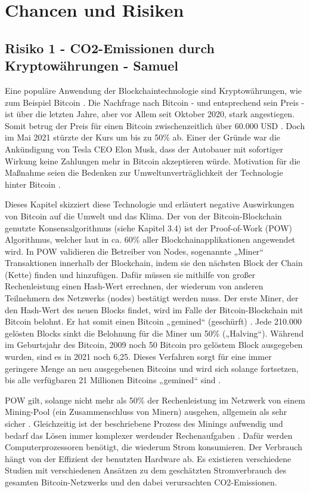 \chapter{Chancen und Risiken}
\section{Risiko 1 - CO2-Emissionen durch Kryptowährungen - Samuel}
Eine populäre Anwendung der Blockchaintechnologie sind Kryptowährungen, wie zum Beispiel Bitcoin \cite{schinckus_good_2020}. Die Nachfrage nach Bitcoin - und entsprechend sein Preis - ist über die letzten Jahre, aber vor Allem seit Oktober 2020, stark angestiegen. Somit betrug der Preis für einen Bitcoin zwischenzeitlich über 60.000 USD \cite{noauthor_coindesk_2021}. Doch im Mai 2021 stürzte der Kurs um bis zu 50\% ab. Einer der Gründe war die Ankündigung von Tesla CEO Elon Musk, dass der Autobauer mit sofortiger Wirkung keine Zahlungen mehr in Bitcoin akzeptieren würde. Motivation für die Maßnahme seien die Bedenken zur Umweltunverträglichkeit der Technologie hinter Bitcoin \cite{waters_musk_2021}. 

Dieses Kapitel skizziert diese Technologie und erläutert negative Auswirkungen von Bitcoin auf die Umwelt und das Klima. \newline
Der von der Bitcoin-Blockchain genutzte Konsensalgorithmus (siehe Kapitel 3.4) ist der Proof-of-Work (POW) Algorithmus, welcher laut \cite{andoni_blockchain_2019} in ca. 60\% aller Blockchainapplikationen angewendet wird.  In POW validieren die Betreiber von Nodes, sogenannte „Miner“ Transaktionen innerhalb der Blockchain, indem sie den nächsten Block der Chain (Kette) finden und hinzufügen. Dafür müssen sie mithilfe von großer Rechenleistung einen Hash-Wert errechnen, der wiederum von anderen Teilnehmern des Netzwerks (nodes) bestätigt werden muss. Der erste Miner, der den Hash-Wert des neuen Blocks findet, wird im Falle der Bitcoin-Blockchain mit Bitcoin belohnt. Er hat somit einen Bitcoin „gemined“ (geschürft) \cite{adam_konsensmodelle_2020}. Jede 210.000 gelösten Blocks sinkt die Belohnung für die Miner um 50\% („Halving“). Während im Geburtsjahr des Bitcoin, 2009 noch 50 Bitcoin pro gelöstem Block ausgegeben wurden, sind es in 2021 noch 6,25. Dieses Verfahren sorgt für eine immer geringere Menge an neu ausgegebenen Bitcoins und wird sich solange fortsetzen, bis alle verfügbaren 21 Millionen Bitcoins „gemined“ sind \cite{schar_understanding_2020}. \newline

POW gilt, solange nicht mehr als 50\% der Rechenleistung im Netzwerk von einem Mining-Pool (ein Zusammenschluss von Minern) ausgehen, allgemein als sehr sicher \cite{gervais_security_2016}. Gleichzeitig ist der beschriebene Prozess des Minings aufwendig und bedarf das Lösen immer komplexer werdender Rechenaufgaben \cite{stoll_carbon_2019}\cite{schinckus_good_2020}. Dafür werden Computerprozessoren benötigt, die wiederum Strom konsumieren. Der Verbrauch hängt von der Effizient der benutzten Hardware ab. Es existieren verschiedene Studien mit verschiedenen Ansätzen zu dem geschätzten Stromverbrauch des gesamten Bitcoin-Netzwerks und den dabei verursachten CO2-Emissionen. \newline

